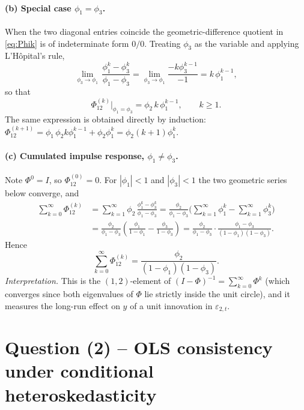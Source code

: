 \documentclass[12pt]{article}
\begin{document}
\paragraph{(b) Special case $\phi_1=\phi_3$.} When the two diagonal entries coincide the geometric-difference quotient in \eqref{eq:Phik} is of indeterminate form $0/0$. Treating $\phi_3$ as the variable and applying L'H\^{o}pital's rule,
\begin{equation*}
\lim_{\phi_3\to\phi_1}\,\frac{\phi_1^{k}-\phi_3^{k}}{\phi_1-\phi_3}
= \lim_{\phi_3\to\phi_1}\frac{-k\phi_3^{k-1}}{-1}
= k\,\phi_1^{k-1},
\end{equation*}
so that
\begin{equation}
\Phi^{(k)}_{12}\bigg|_{\phi_1=\phi_3} = \phi_2\,k\,\phi_1^{k-1},\qquad k\geq 1.\label{eq:Phik-equal}
\end{equation}
The same expression is obtained directly by induction: $\Phi^{(k+1)}_{12}=\phi_1\,\phi_2 k\phi_1^{k-1}+\phi_2\phi_1^{k}=\phi_2(k+1)\phi_1^{k}$.

\paragraph{(c) Cumulated impulse response, $\phi_1\neq\phi_3$.} Note $\Phi^{0}=I$, so $\Phi^{(0)}_{12}=0$. For $|\phi_1|<1$ and $|\phi_3|<1$ the two geometric series below converge, and
\begin{align*}
\sum_{k=0}^{\infty}\Phi^{(k)}_{12}
&= \sum_{k=1}^{\infty}\phi_2\,\frac{\phi_1^{k}-\phi_3^{k}}{\phi_1-\phi_3}
= \frac{\phi_2}{\phi_1-\phi_3}\Bigg(\sum_{k=1}^{\infty}\phi_1^{k}-\sum_{k=1}^{\infty}\phi_3^{k}\Bigg)\\
&= \frac{\phi_2}{\phi_1-\phi_3}\!\left(\frac{\phi_1}{1-\phi_1}-\frac{\phi_3}{1-\phi_3}\right)
= \frac{\phi_2}{\phi_1-\phi_3}\cdot\frac{\phi_1-\phi_3}{(1-\phi_1)(1-\phi_3)}.
\end{align*}
Hence
\begin{equation}
\sum_{k=0}^{\infty}\Phi^{(k)}_{12} = \frac{\phi_2}{(1-\phi_1)(1-\phi_3)}.\label{eq:cumIRF}
\end{equation}
\textit{Interpretation.} This is the $(1,2)$-element of $(I-\Phi)^{-1}=\sum_{k=0}^{\infty}\Phi^{k}$ (which converges since both eigenvalues of $\Phi$ lie strictly inside the unit circle), and it measures the long-run effect on $y$ of a unit innovation in $\varepsilon_{2,t}$.

\section*{Question (2) -- OLS consistency under conditional heteroskedasticity}
\end{document}
